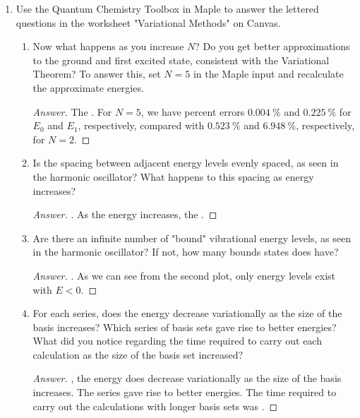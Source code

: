 \documentclass[../psets.tex]{subfiles}
\begin{document}
\begin{enumerate}
\begin{enumerate}
\begin{proof}[Answer]
        \end{proof}
    \end{enumerate}
    \item Use the Quantum Chemistry Toolbox in Maple to answer the lettered questions in the worksheet "Variational Methods" on Canvas.
    \begin{enumerate}
        \item Now what happens as you increase $N$? Do you get better approximations to the ground and first excited state, consistent with the Variational Theorem? To answer this, set $N=5$ in the Maple input and recalculate the approximate energies.
        \begin{proof}[Answer]
            The . For $N=5$, we have percent errors $\SI{0.004}{\percent}$ and $\SI{0.225}{\percent}$ for $E_0$ and $E_1$, respectively, compared with $\SI{0.523}{\percent}$ and $\SI{6.948}{\percent}$, respectively, for $N=2$.
        \end{proof}
        \item Is the spacing between adjacent energy levels evenly spaced, as seen in the harmonic oscillator? What happens to this spacing as energy increases?
        \begin{proof}[Answer]
            . As the energy increases, the .
        \end{proof}
        \item Are there an infinite number of "bound" vibrational energy levels, as seen in the harmonic oscillator? If not, how many bounds states does  have?
        \begin{proof}[Answer]
            . As we can see from the second plot, only  energy levels exist with $E<0$.
        \end{proof}
        \item For each series, does the energy decrease variationally as the size of the basis increases? Which series of basis sets gave rise to better energies? What did you notice regarding the time required to carry out each calculation as the size of the basis set increased?
        \begin{proof}[Answer]
            , the energy does decrease variationally as the size of the basis increases. The  series gave rise to better energies. The time required to carry out the calculations with longer basis sets was .
        \end{proof}
    \end{enumerate}
\end{enumerate}
\end{document}
